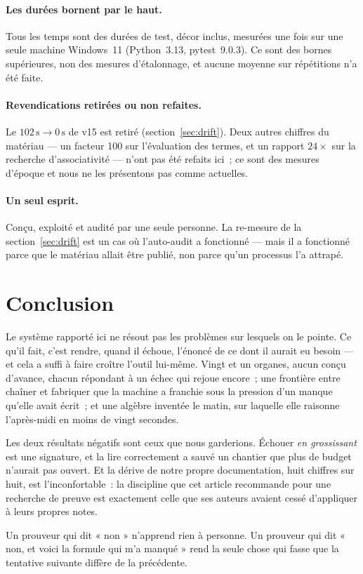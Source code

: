 \documentclass[11pt]{article}
\theoremstyle{remark}\newtheorem{remarque}{Remarque}
\begin{document}
\paragraph{Les durées bornent par le haut.} Tous les temps sont des durées de test,
décor inclus, mesurées une fois sur une seule machine Windows~11 (Python~3.13,
pytest~9.0.3). Ce sont des bornes supérieures, non des mesures d'étalonnage, et aucune
moyenne sur répétitions n'a été faite.

\paragraph{Revendications retirées ou non refaites.} Le $102\,\mathrm{s} \to
0\,\mathrm{s}$ de v15 est retiré (section~\ref{sec:drift}). Deux autres chiffres du
matériau --- un facteur 100 sur l'évaluation des termes, et un rapport $24\times$ sur la
recherche d'associativité --- n'ont pas été refaits ici~; ce sont des mesures d'époque et
nous ne les présentons pas comme actuelles.

\paragraph{Un seul esprit.} Conçu, exploité et audité par une seule personne. La
re-mesure de la section~\ref{sec:drift} est un cas où l'auto-audit a fonctionné --- mais
il a fonctionné parce que le matériau allait être publié, non parce qu'un processus l'a
attrapé.

\section{Conclusion}

Le système rapporté ici ne résout pas les problèmes sur lesquels on le pointe. Ce qu'il
fait, c'est rendre, quand il échoue, l'énoncé de ce dont il aurait eu besoin --- et cela
a suffi à faire croître l'outil lui-même. Vingt et un organes, aucun conçu d'avance,
chacun répondant à un échec qui rejoue encore~; une frontière entre chaîner et fabriquer
que la machine a franchie sous la pression d'un manque qu'elle avait écrit~; et une
algèbre inventée le matin, sur laquelle elle raisonne l'après-midi en moins de vingt
secondes.

Les deux résultats négatifs sont ceux que nous garderions. Échouer \emph{en grossissant}
est une signature, et la lire correctement a sauvé un chantier que plus de budget n'aurait
pas ouvert. Et la dérive de notre propre documentation, huit chiffres sur huit, est
l'inconfortable~: la discipline que cet article recommande pour une recherche de preuve
est exactement celle que ses auteurs avaient cessé d'appliquer à leurs propres notes.

Un prouveur qui dit « non » n'apprend rien à personne. Un prouveur qui dit « non, et
voici la formule qui m'a manqué » rend la seule chose qui fasse que la tentative suivante
diffère de la précédente.



\end{document}
